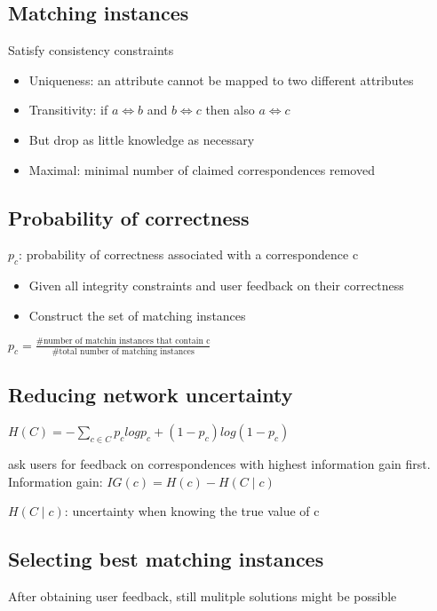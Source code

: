 \subsection{Matching instances}
Satisfy consistency constraints
\begin{itemize}
\item Uniqueness: an attribute cannot be mapped to two different
  attributes
\item Transitivity: if $ a \iff b $ and $ b \iff c $ then also $ a
  \iff c $
\item But drop as little knowledge as necessary
\item Maximal: minimal number of claimed correspondences removed
\end{itemize}

\subsection{Probability of correctness}

$ p_c $: probability of correctness associated with a correspondence c
\begin{itemize}
\item Given all integrity constraints and user feedback on their
  correctness
\item Construct the set of matching instances
\end{itemize}

$ p_c = \frac{\text{\#number of matchin instances that contain
    c}}{\text{\#total number of matching instances}}$


\subsection{Reducing network uncertainty}
$ H(C) = - \sum_{c \in C} p_c log p_c + (1 - p_c) log(1 - p_c) $

ask users for feedback on correspondences with highest information
gain first. \\
Information gain: $ IG(c) = H(c) - H(C \mid c) $

$ H(C \mid c) $: uncertainty when knowing the true value of c

\subsection{Selecting best matching instances}
After obtaining user feedback, still mulitple solutions might be
possible \\

